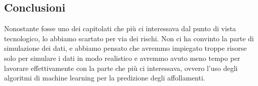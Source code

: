 \documentclass[../studio-di-fattibilita.tex]{subfiles}
\begin{document}
\subsection{Conclusioni}%
\label{sub:c3_conclusioni}
Nonostante fosse uno dei capitolati che più ci interessava dal punto di vista tecnologico, lo abbiamo scartato per via dei rischi. Non ci ha convinto la parte di simulazione dei dati, e abbiamo pensato che avremmo impiegato troppe risorse solo per simulare i dati in modo realistico e avremmo avuto meno tempo per lavorare effettivamente con la parte che più ci interessava, ovvero l’uso degli algoritmi di machine learning per la predizione degli affollamenti.
\end{document}
